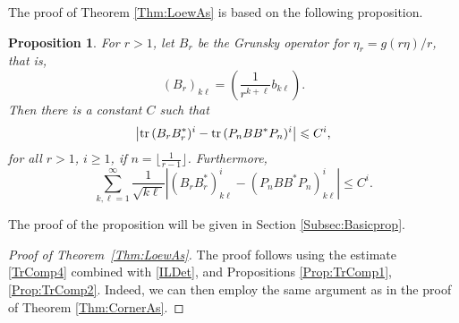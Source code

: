 \documentclass{article}
\numberwithin{equation}{section}
\numberwithin{figure}{section}
\theoremstyle{plain}
\theoremstyle{plain}
\numberwithin{thm}{section}
\newtheorem{proposition}[thm]{Proposition}
\theoremstyle{remark}
\newcommand{\Tr}{\text{{\rm tr\,}}}
\let \le \leqslant
\let \ge \geqslant
\begin{document}
The proof of Theorem \ref{Thm:LoewAs} is based on the following proposition.
\begin{proposition}\label{Prop:TrComp4}
For $r > 1$, let $B_r$ be the Grunsky operator for $\eta_r = g(r \eta)/r$, that is, 
\begin{equation}\label{Br}
(B_r)_{k\ell}=\left(\frac 1{r^{k+\ell}}b_{k\ell}\right).
\end{equation}
Then there is a constant $C$ such that
\begin{equation}\label{TrComp4}
\bigl|\Tr(B_rB_r^*)^i-\Tr(P_nBB^*P_n)^i\bigr|\le C^i,
\end{equation}
for all $r>1$, $i\ge 1$, if $n=\lfloor \frac 1{r-1}\rfloor $. Furthermore,
\begin{equation}\label{BrBPn}
\sum_{k,\ell=1}^\infty\frac 1{\sqrt{k\ell}} |(B_rB_r^*)^i_{k\ell}-(P_nBB^*P_n)^i_{k\ell}|\le C^i.
\end{equation}
\end{proposition}

The proof of the proposition will be given in Section \ref{Subsec:Basicprop}.  
\begin{proof}[Proof of Theorem~\ref{Thm:LoewAs}]
The proof follows using the estimate \eqref{TrComp4} combined with \eqref{ILDet}, and Propositions \ref{Prop:TrComp1},
\ref{Prop:TrComp2}. Indeed, we can then employ the same argument as in the proof of Theorem \ref{Thm:CornerAs}.
\end{proof}
\end{document}

